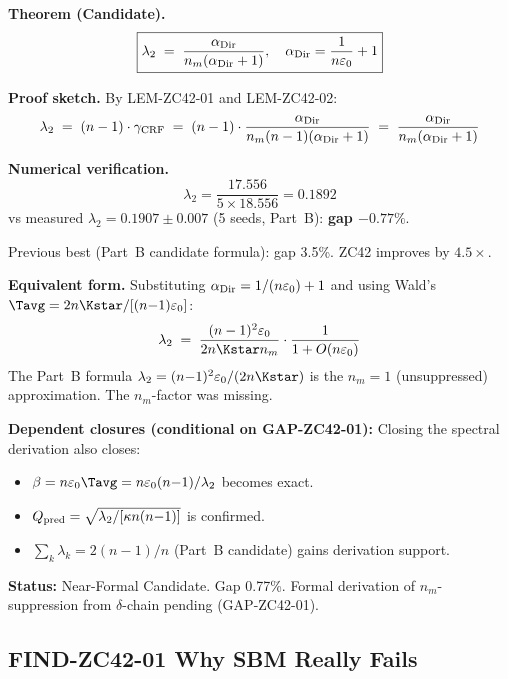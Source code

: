 \documentclass[12pt, a4paper]{article}
\providecommand{\eps}{\varepsilon_0}
\providecommand{\ltwo}{\lambda_2}
\providecommand{\nm}{n_m}
\providecommand{\alphDir}{\alpha_{\rm Dir}}
\begin{document}
\begin{formalbox}[title={THM-ZC42-01: $\lambda_2 =
  \alphDir/[\nm(\alphDir{+}1)]$ (Near-Formal, 0.77\%)}]
\textbf{Theorem (Candidate).}
\[
  \boxed{\ltwo \;=\; \frac{\alphDir}{\nm(\alphDir+1)},
  \quad \alphDir = \frac{1}{n\eps} + 1}
\]

\textbf{Proof sketch.}
By LEM-ZC42-01 and LEM-ZC42-02:
\[
  \ltwo \;=\; (n-1)\cdot\gamma_{\rm CRF}
  \;=\; (n-1)\cdot\frac{\alphDir}{\nm(n-1)(\alphDir+1)}
  \;=\; \frac{\alphDir}{\nm(\alphDir+1)}
\]

\textbf{Numerical verification.}
\[
  \ltwo = \frac{17.556}{5\times 18.556} = 0.1892
\]
vs measured $\ltwo = 0.1907\pm 0.007$ (5 seeds, Part~B):
\textbf{gap $-0.77\%$}.

Previous best (Part~B candidate formula): gap 3.5\%.
ZC42 improves by $4.5\times$.

\textbf{Equivalent form.}
Substituting $\alphDir = 1/(n\eps)+1$ and using Wald's
$\Tavg = 2n\Kstar/[(n{-}1)\eps]$:
\[
  \ltwo \;=\; \frac{(n-1)^2\eps}{2n\Kstar\nm}
  \cdot\frac{1}{1 + O(n\eps)}
\]
The Part~B formula $\ltwo = (n{-}1)^2\eps/(2n\Kstar)$
is the $\nm = 1$ (unsuppressed) approximation. The
$\nm$-factor was missing.

\textbf{Dependent closures (conditional on GAP-ZC42-01):}
Closing the spectral derivation also closes:
\begin{itemize}[leftmargin=*, noitemsep]
\item $\beta = n\eps\Tavg = n\eps(n{-}1)/\ltwo$
  becomes exact.
\item $Q_{\rm pred} = \sqrt{\ltwo/[\kappa n(n{-}1)]}$
  is confirmed.
\item $\sum_k\lambda_k = 2(n{-}1)/n$ (Part~B candidate)
  gains derivation support.
\end{itemize}

\textbf{Status:} Near-Formal Candidate. Gap 0.77\%.
Formal derivation of $\nm$-suppression from $\delta$-chain
pending (GAP-ZC42-01).
\end{formalbox}

\subsection{FIND-ZC42-01 \quad Why SBM Really Fails}

\end{document}
